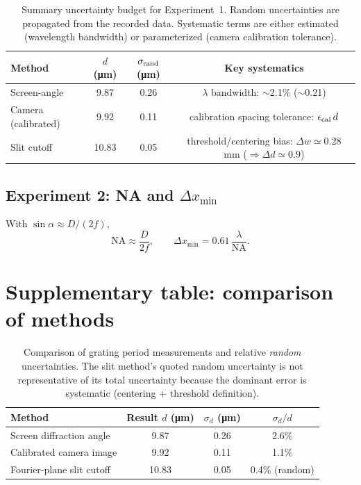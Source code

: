 \documentclass[10pt,twocolumn]{article}
\begin{document}
\begin{table}[H]
\centering
\caption{Summary uncertainty budget for Experiment~1. Random uncertainties are propagated from the recorded data.
Systematic terms are either estimated (wavelength bandwidth) or parameterized (camera calibration tolerance).}
\label{tab:ubudget}
\begin{tabular}{@{}lccc@{}}
\toprule
Method & $d$ (\si{\micro\meter}) & $\sigma_{\rm rand}$ (\si{\micro\meter}) & Key systematics \\ \midrule
Screen-angle & 9.87 & 0.26 & $\lambda$ bandwidth: $\sim$2.1\% ($\sim$0.21) \\
Camera (calibrated) & 9.92 & 0.11 & calibration spacing tolerance: $\epsilon_{\rm cal}\,d$ \\
Slit cutoff & 10.83 & 0.05 & threshold/centering bias: $\Delta w\simeq0.28$ mm ($\Rightarrow \Delta d\simeq0.9$) \\
\bottomrule
\end{tabular}
\end{table}

\subsection{Experiment 2: NA and $\Delta x_{\min}$}
With $\sin\alpha\approx D/(2f)$,
\begin{equation}
\mathrm{NA}\approx\frac{D}{2f},\qquad
\Delta x_{\min}=0.61\,\frac{\lambda}{\mathrm{NA}}.
\end{equation}

\clearpage
\section{Supplementary table: comparison of methods}
\begin{table}[H]
\centering
\caption{Comparison of grating period measurements and relative \emph{random} uncertainties. The slit method's quoted random uncertainty is not representative of its total uncertainty because the dominant error is systematic (centering + threshold definition).}
\label{tab:compare}
\begin{tabular}{@{}lccc@{}}
\toprule
Method & Result $d$ (\si{\micro\meter}) & $\sigma_d$ (\si{\micro\meter}) & $\sigma_d/d$ \\ \midrule
Screen diffraction angle & 9.87 & 0.26 & 2.6\% \\
Calibrated camera image & 9.92 & 0.11 & 1.1\% \\
Fourier-plane slit cutoff & 10.83 & 0.05 & 0.4\% (random) \\ \bottomrule
\end{tabular}
\end{table}
\end{document}
